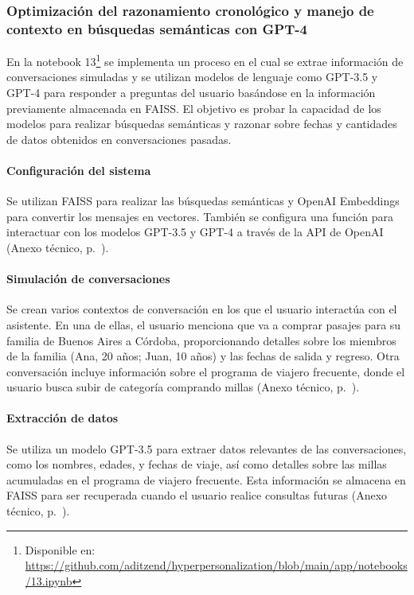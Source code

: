 \subsubsection{Optimización del razonamiento cronológico y manejo de contexto en búsquedas semánticas con GPT-4}

En la notebook 13\footnote{Disponible en: \url{https://github.com/aditzend/hyperpersonalization/blob/main/app/notebooks/13.ipynb}} se implementa un proceso en el cual se extrae información de conversaciones simuladas y se utilizan modelos de lenguaje como GPT-3.5 y GPT-4 para responder a preguntas del usuario basándose en la información previamente almacenada en FAISS. El objetivo es probar la capacidad de los modelos para realizar búsquedas semánticas y razonar sobre fechas y cantidades de datos obtenidos en conversaciones pasadas.

\paragraph{Configuración del sistema}

Se utilizan FAISS para realizar las búsquedas semánticas y OpenAI Embeddings para convertir los mensajes en vectores. También se configura una función para interactuar con los modelos GPT-3.5 y GPT-4 a través de la API de OpenAI (Anexo técnico, p.~\pageref{anexo:code-4-1-13-1}).

\paragraph{Simulación de conversaciones}

Se crean varios contextos de conversación en los que el usuario interactúa con el asistente. En una de ellas, el usuario menciona que va a comprar pasajes para su familia de Buenos Aires a Córdoba, proporcionando detalles sobre los miembros de la familia (Ana, 20 años; Juan, 10 años) y las fechas de salida y regreso. Otra conversación incluye información sobre el programa de viajero frecuente, donde el usuario busca subir de categoría comprando millas (Anexo técnico, p.~\pageref{anexo:code-4-1-13-2}).

\paragraph{Extracción de datos}

Se utiliza un modelo GPT-3.5 para extraer datos relevantes de las conversaciones, como los nombres, edades, y fechas de viaje, así como detalles sobre las millas acumuladas en el programa de viajero frecuente. Esta información se almacena en FAISS para ser recuperada cuando el usuario realice consultas futuras (Anexo técnico, p.~\pageref{anexo:code-4-1-13-3}).

